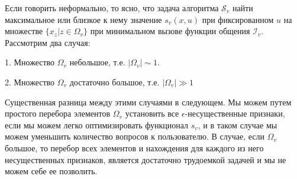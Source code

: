 \documentclass[12pt]{article}
\begin{document}
Если говорить неформально, то ясно, что задача алгоритма $\mathcal{S}_v$ найти максимальное или близкое к нему значение $s_v(x, u)$ при фиксированном $u$ на множестве $\{x_z|z \in \Omega_v\}$ при минимальном вызове функции общения $\mathcal{I}_v$. Рассмотрим два случая:

1. Множество $\Omega_v$ небольшое, т.е. $|\Omega_v| \sim 1$.

2. Множество $\Omega_v$ достаточно большое, т.е. $|\Omega_v|\gg 1$

Существенная разница между этими случаями в следующем. Мы можем путем простого перебора элементов $\Omega_v$ установить все $\epsilon$-несущественные признаки, если мы можем легко оптимизировать функционал $s_v$, и в таком случае мы можем уменьшить количество вопросов к пользователю. В случае, если $\Omega_v$ большое, то перебор всех элементов и нахождения для каждого из него несущественных признаков, является достаточно трудоемкой задачей и мы не можем себе ее позволить.
\end{document}
